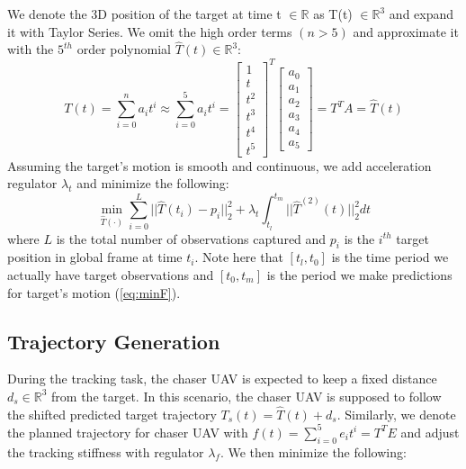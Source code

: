 We denote the 3D position of the target at time t $\in \mathbb{R}$ as T(t) $\in \mathbb{R}^{3}$ and expand it with Taylor Series. We omit the high order terms $(n>5)$ and approximate it with the $5^{th}$ order polynomial $\hat{T}(t) \in \mathbb{R}^{3}$:
\begin{equation}\label{eq:poly5}
T(t) = \sum^n_{i=0} a_{i}t^i
\approx \sum^5_{i=0} a_{i}t^i
= \begin{bmatrix}1\\t\\t^2\\t^3\\t^4\\t^5\end{bmatrix}^T\begin{bmatrix}a_0\\a_1\\a_2\\a_3\\a_4\\a_5\end{bmatrix}
= T^TA = \hat{T}(t)
\end{equation}
\noindent
Assuming the target's motion is smooth and continuous, we add acceleration regulator $\lambda_{t}$ and minimize the following:
\begin{equation}\label{eq:minT}
\min_{\hat{T}(\cdot)} \sum^{L}_{i=0} ||\hat{T}(t_i)-p_i||^2_2 + \lambda_t\int_{t_l}^{t_m} ||\hat{T}^{(2)}(t)||^2_2dt
\end{equation}
\noindent
where $L$ is the total number of observations captured and $p_i$ is the $i^{th}$ target position in global frame at time $t_i$. Note here that $[t_l, t_0]$ is the time period we actually have target observations and $[t_0, t_m]$ is the period we make predictions for target's motion (\ref{eq:minF}).


\subsection{Trajectory Generation}

During the tracking task, the chaser UAV is expected to keep a fixed distance $d_s\in\mathbb{R}^{3}$ from the target. In this scenario, the chaser UAV is supposed to follow the shifted predicted target trajectory $T_s(t)=\hat{T}(t)+d_s$. Similarly, we denote the planned trajectory for chaser UAV with $f(t)=\sum^5_{i=0} e_{i}t^i=T^TE$ and adjust the tracking stiffness with regulator $\lambda_f$. We then minimize the following:

